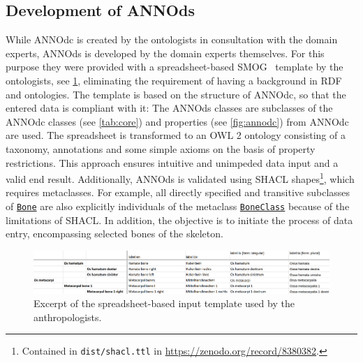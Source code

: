\documentclass[sw]{iosart2x}
\newcommand{\aw}{AnthroWorks3D}
\newcommand{\anno}[1]{\href{https://annosaxfdm.de/ontology/#1}{\texttt{#1}}}
\begin{document}
\subsection{Development of ANNOds}\label{sec:annods}
While ANNOdc is created by the ontologists in consultation with the domain experts, ANNOds is developed by the domain experts themselves.
For this purpose they were provided with a spreadsheet-based SMOG~\citep{smog} template by the ontologists, see \cref{fig:smog}, eliminating the requirement of having a background in RDF and ontologies.
The template is based on the structure of ANNOdc, so that the entered data is compliant with it: The ANNOds classes are subclasses of the ANNOdc classes (see \cref{tab:core}) and properties (see \cref{fig:annodc}) from ANNOdc are used.
The spreadsheet is transformed to an OWL 2 ontology consisting of a taxonomy, annotations and some simple axioms on the basis of property restrictions.
This approach ensures intuitive and unimpeded data input and a valid end result.
Additionally, ANNOds is validated using SHACL shapes\footnote{Contained in \texttt{dist/shacl.ttl} in \url{https://zenodo.org/record/8380382}.}, which requires metaclasses.
For example, all directly specified and transitive subclasses of \anno{Bone} are also explicitly individuals of the metaclass \anno{BoneClass} because of the limitations of SHACL.
In addition, the objective is to initiate the process of data entry, encompassing selected bones of the skeleton.

\begin{figure}[ht]
\includegraphics[width=\textwidth]{img/smog.png}
\caption{Excerpt of the spreadsheet-based input template used by the anthropologists.}\label{fig:smog}
\end{figure}
\end{document}

